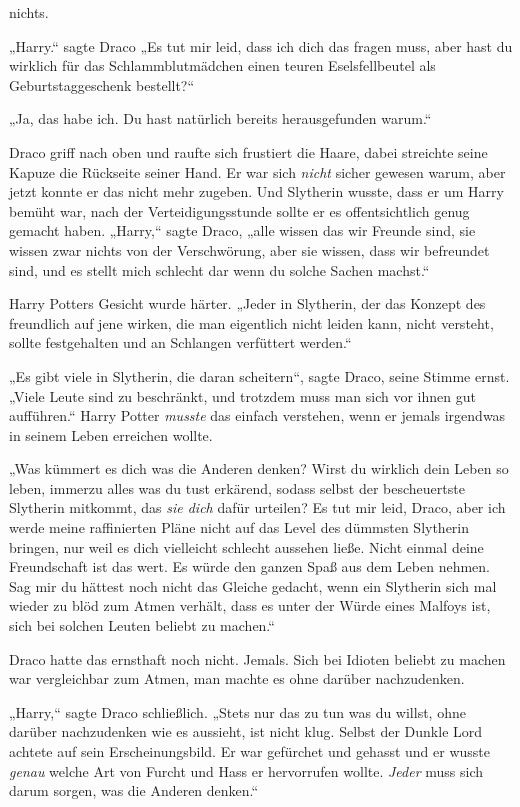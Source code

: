{nichts.

„Harry.“ sagte Draco „Es tut mir leid, dass ich dich das fragen muss, aber hast du wirklich für das Schlammblutmädchen einen teuren Eselsfellbeutel als Geburtstaggeschenk bestellt?“

„Ja, das habe ich. Du hast natürlich bereits herausgefunden warum.“

Draco griff nach oben und raufte sich frustiert die Haare, dabei streichte seine Kapuze die Rückseite seiner Hand. Er war sich \emph{nicht} sicher gewesen warum, aber jetzt konnte er das nicht mehr zugeben. Und Slytherin wusste, dass er um Harry bemüht war, nach der Verteidigungsstunde sollte er es offentsichtlich genug gemacht haben. „Harry,“ sagte Draco, „alle wissen das wir Freunde sind, sie wissen zwar nichts von der Verschwörung, aber sie wissen, dass wir befreundet sind, und es stellt mich schlecht dar wenn du solche Sachen machst.“

Harry Potters Gesicht wurde härter. „Jeder in Slytherin, der das Konzept des freundlich auf jene wirken, die man eigentlich nicht leiden kann, nicht versteht, sollte festgehalten und an Schlangen verfüttert werden.“

„Es gibt viele in Slytherin, die daran scheitern“, sagte Draco, seine Stimme ernst. „Viele Leute sind zu beschränkt, und trotzdem muss man sich vor ihnen gut aufführen.“ Harry Potter \emph{musste} das einfach verstehen, wenn er jemals irgendwas in seinem Leben erreichen wollte.

„Was kümmert es dich was die Anderen denken? Wirst du wirklich dein Leben so leben, immerzu alles was du tust erkärend, sodass selbst der bescheuertste Slytherin mitkommt, das \emph{sie dich} dafür urteilen? Es tut mir leid, Draco, aber ich werde meine raffinierten Pläne nicht auf das Level des dümmsten Slytherin bringen, nur weil es dich vielleicht schlecht aussehen ließe. Nicht einmal deine Freundschaft ist das wert. Es würde den ganzen Spaß aus dem Leben nehmen. Sag mir du hättest noch nicht das Gleiche gedacht, wenn ein Slytherin sich mal wieder zu blöd zum Atmen verhält, dass es unter der Würde eines Malfoys ist, sich bei solchen Leuten beliebt zu machen.“

Draco hatte das ernsthaft noch nicht. Jemals. Sich bei Idioten beliebt zu machen war vergleichbar zum Atmen, man machte es ohne darüber nachzudenken.

„Harry,“ sagte Draco schließlich. „Stets nur das zu tun was du willst, ohne darüber nachzudenken wie es aussieht, ist nicht klug. Selbst der Dunkle Lord achtete auf sein Erscheinungsbild. Er war gefürchet und gehasst und er wusste \emph{genau} welche Art von Furcht und Hass er hervorrufen wollte. \emph{Jeder} muss sich darum sorgen, was die Anderen denken.“

}
